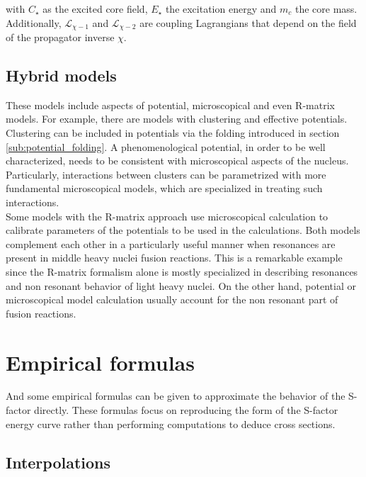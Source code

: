 \documentclass[openany]{book}
\begin{document}
with $C_{\star}$ as the excited core field, $E_{\star}$ the excitation energy and $m_c$ the core mass. Additionally, $ \mathcal{L}_{\chi-1}$ and $ \mathcal{L}_{\chi-2}$ are coupling Lagrangians that depend on the field of the propagator inverse $\chi$.
 
\subsection{Hybrid models} \label{sub:special_hybrid}

These models include aspects of potential, microscopical and even R-matrix models. For example, there are models with clustering and effective potentials. \\

Clustering can be included in potentials via the folding introduced in section \ref{sub:potential_folding}. A phenomenological potential, in order to be well characterized, needs to be consistent with microscopical aspects of the nucleus.  Particularly, interactions between clusters can be parametrized with more fundamental microscopical models, which are specialized in treating such interactions. \\

Some models with the R-matrix approach use microscopical calculation to calibrate parameters of the potentials to be used in the calculations. Both models complement each other in a particularly useful manner when resonances are present in middle heavy nuclei fusion reactions. This is a remarkable example since the R-matrix formalism alone is mostly specialized in describing resonances and non resonant behavior of light heavy nuclei. On the other hand, potential or microscopical model calculation usually account for the non resonant part of fusion reactions. \\

\section{Empirical formulas} \label{sec:empiricalFormulas}

And some empirical formulas can be given to approximate the behavior of the S-factor directly. These formulas focus on reproducing the form of the S-factor energy curve rather than performing computations to deduce cross sections.

\subsection{Interpolations} \label{sub:empirical_interpolation}
\end{document}
